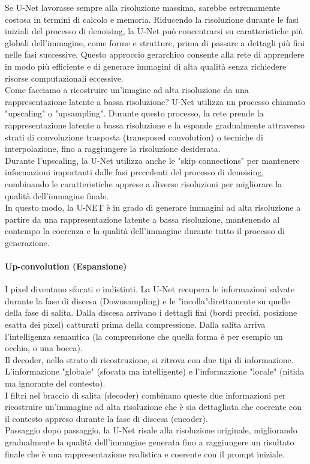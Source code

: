 Se U-Net lavorasse sempre alla risoluzione massima, sarebbe estremamente costosa in termini di calcolo e memoria. Riducendo la risoluzione durante le fasi iniziali del processo di denoising, la U-Net può concentrarsi su caratteristiche più globali dell'immagine, come forme e strutture, prima di passare a dettagli più fini nelle fasi successive. Questo approccio gerarchico consente alla rete di apprendere in modo più efficiente e di generare immagini di alta qualità senza richiedere risorse computazionali eccessive.\\

Come facciamo a ricostruire un'imagine ad alta risoluzione da una rappresentazione latente a bassa risoluzione? U-Net utilizza un processo chiamato "upscaling" o "upsampling". Durante questo processo, la rete prende la rappresentazione latente a bassa risoluzione e la espande gradualmente attraverso strati di convoluzione trasposta (transposed convolution) o tecniche di interpolazione, fino a raggiungere la risoluzione desiderata.\\
Durante l'upscaling, la U-Net utilizza anche le "skip connections" per mantenere informazioni importanti dalle fasi precedenti del processo di denoising, combinando le caratteristiche apprese a diverse risoluzioni per migliorare la qualità dell'immagine finale.\\
In questo modo, la U-NET è in grado di generare immagini ad alta risoluzione a partire da una rappresentazione latente a bassa risoluzione, mantenendo al contempo la coerenza e la qualità dell'immagine durante tutto il processo di generazione.\\

\paragraph{Up-convolution (Espansione)}
I pixel diventano sfocati e indistinti. 
La U-Net recupera le informazioni salvate durante la fase di discesa (Downsampling) e le "incolla"direttamente su quelle della fase di salita.
Dalla discesa arrivano i dettagli fini (bordi precisi, posizione esatta dei pixel) catturati prima della compressione.
Dalla salita arriva l'intelligenza semantica (la comprensione che quella forma é per esempio un occhio, o una bocca).\\

Il decoder, nello strato di ricostruzione, si ritrova con due tipi di informazione. L'informazione "globale" (sfocata ma intelligente)
e l'informazione "locale" (nitida ma ignorante del contesto).\\
I filtri nel braccio di salita (decoder) combinano queste due informazioni per ricostruire un'immagine ad alta risoluzione che è sia dettagliata che coerente con il contesto appreso durante la fase di discesa (encoder).\\
Passaggio dopo passaggio, la U-Net risale alla risoluzione originale, migliorando gradualmente la qualità dell'immagine generata fino a raggiungere un risultato finale che è una rappresentazione realistica e coerente con il prompt iniziale.\\

